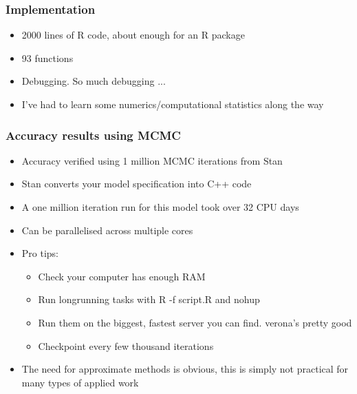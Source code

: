 \documentclass{beamer}
\begin{document}
\begin{frame}
\frametitle{Implementation}
\begin{itemize}
\item 2000 lines of R code, about enough for an R package
\item 93 functions
\item Debugging. So much debugging ...
\item I've had to learn some numerics/computational statistics along the
way
\end{itemize}
\end{frame}

\begin{frame}
\frametitle{Accuracy results using MCMC}
\begin{itemize}
\item Accuracy verified using 1 million MCMC iterations from Stan
\item Stan converts your model specification into C++ code
\item A one million iteration run for this model took over 32 CPU days
\item Can be parallelised across multiple cores
\item Pro tips:
\begin{itemize}
\item Check your computer has enough RAM
\item Run longrunning tasks with R -f script.R and nohup
\item Run them on the biggest, fastest server you can find. verona's pretty good
\item Checkpoint every few thousand iterations
\end{itemize}
\item The need for approximate methods is obvious, this is simply not
practical for many types of applied work
\end{itemize}
\end{frame}
\end{document}
